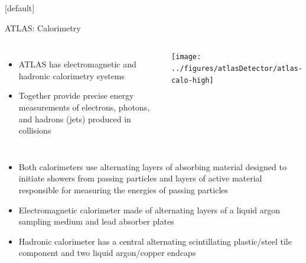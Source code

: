 \documentclass{beamer}
\begin{document}
{  \makeatletter %
  [default]
  \def\beamer@entrycode{\vspace*{-1.075\headheight}}
  \begin{frame}{ATLAS: Calorimetry}
    \vspace{5pt}
    \begin{columns}
      \begin{itemize}\small
      \item ATLAS has electromagnetic and hadronic calorimetry systems
      \item Together provide precise energy measurements of electrons, photons, and hadrons (jets) produced in collisions
      \end{itemize}  
      \texttt{[image: ../figures/atlasDetector/atlas-calo-high]}
    \end{columns}
    \vspace{-5pt}
    \begin{itemize}\small
      \item Both calorimeters use alternating layers of absorbing material designed to initiate showers from passing particles and layers of active material responsible for measuring the energies of passing particles 
    \item Electromagnetic calorimeter made of alternating layers of a liquid argon sampling medium and lead absorber plates
    \item Hadronic calorimeter has a central alternating scintillating plastic/steel tile component and two liquid argon/copper endcaps
    \end{itemize}  
  \end{frame}
  
}
\end{document}
